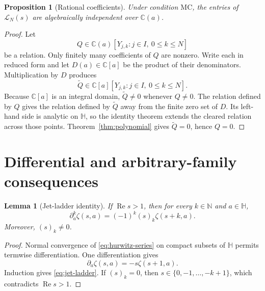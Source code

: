 \documentclass[11pt,reqno]{amsart}
\newtheorem{proposition}[theorem]{Proposition}
\newtheorem{lemma}[theorem]{Lemma}
\theoremstyle{definition}
\theoremstyle{remark}
\newcommand{\C}{\mathbb C}
\newcommand{\N}{\mathbb N}
\newcommand{\HH}{\mathbb H}
\newcommand{\mc}{\mathrm{MC}}
\begin{document}
\begin{proposition}[Rational coefficients]\label{prop:rational}
Under condition $\mc$, the entries of $\mathcal L_N(s)$ are algebraically
independent over $\C(a)$.
\end{proposition}

\begin{proof}
Let
\[
  Q\in\C(a)[Y_{j,k}:j\in I,\ 0\leq k\leq N]
\]
be a relation.  Only finitely many coefficients of $Q$ are nonzero.  Write
each in reduced form and let $D(a)\in\C[a]$ be the product of their
denominators.  Multiplication by $D$ produces
\[
  \widetilde Q\in\C[a][Y_{j,k}:j\in I,\ 0\leq k\leq N].
\]
Because $\C[a]$ is an integral domain, $\widetilde Q\neq0$ whenever
$Q\neq0$.  The relation defined by $Q$ gives the relation defined by
$\widetilde Q$ away from the finite zero set of $D$.  Its left-hand side is
analytic on $\HH$, so the identity theorem extends the cleared relation
across those points.  Theorem~\ref{thm:polynomial} gives
$\widetilde Q=0$, hence $Q=0$.
\end{proof}

\section{Differential and arbitrary-family consequences}
\label{sec:differential}

\begin{lemma}[Jet-ladder identity]\label{lem:jet-ladder}
If $\operatorname{Re}s>1$, then for every $k\in\N$ and $a\in\HH$,
\begin{equation}\label{eq:jet-ladder}
  \partial_a^k\zeta(s,a)=(-1)^k(s)_k\zeta(s+k,a).
\end{equation}
Moreover, $(s)_k\neq0$.
\end{lemma}

\begin{proof}
Normal convergence of \eqref{eq:hurwitz-series} on compact subsets of
$\HH$ permits termwise differentiation.  One differentiation gives
\[
  \partial_a\zeta(s,a)=-s\zeta(s+1,a).
\]
Induction gives \eqref{eq:jet-ladder}.  If $(s)_k=0$, then
$s\in\{0,-1,\ldots,-k+1\}$, which contradicts
$\operatorname{Re}s>1$.
\end{proof}
\end{document}
